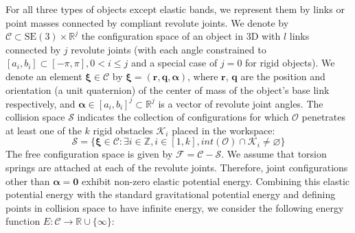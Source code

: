 \documentclass[conference]{IEEEtran}
\newcommand{\bxi}{\boldsymbol{\xi}}
\begin{document}
For all three types of objects except elastic bands, we represent them by links or point masses connected by compliant revolute joints.
We denote by $\mathcal{C}\subset \mathrm{SE}(3)\times \mathbb{R}^{j}$ the configuration space of an object in 3D with $l$ links connected by $j$ revolute joints (with each angle constrained to $[a_i,b_i] \subset [-\pi,\pi], 0 < i \le j$ and a special case of $j=0$ for rigid objects). 
We denote an element $\boldsymbol{\xi}\in\mathcal{C}$ by $\boldsymbol{\xi}=(\boldsymbol{r}, \boldsymbol{q}, \boldsymbol{\alpha})$, where $\boldsymbol{r}$, $\boldsymbol{q}$ are the position and orientation (a unit quaternion) of the center of mass of the object's base link respectively, and $\boldsymbol{\alpha}\in[a_i,b_i]^{j}\subset\mathbb{R}^{j}$ is a vector of revolute joint angles. 
The collision space $\mathcal{S}$ indicates the collection of configurations for which $\mathcal{O}$ penetrates at least one of the $k$ rigid obstacles $\mathcal{K}_{i}$ placed in the workspace:
\begin{equation} \label{eq0}
	\mathcal{S} = \{ \bxi \in \mathcal{C} : \exists i \in \mathbb{Z}, i \in [1,k], int(\mathcal{O})\cap \mathcal{K}_{i} \neq \varnothing \}
\end{equation}
The free configuration space is given by $\mathcal{F} = \mathcal{C} - \mathcal{S}$. 
We assume that torsion springs are attached at each of the revolute joints. 
Therefore, joint configurations other than $\boldsymbol{\alpha}=\boldsymbol{0}$ exhibit non-zero elastic potential energy. 
Combining this elastic potential energy \cite{b22} with the standard gravitational potential energy and defining points in collision space to have infinite energy, we consider the following energy function $E:\mathcal{C}\to \mathbb{R}\cup\{\infty\}$:

\end{document}
